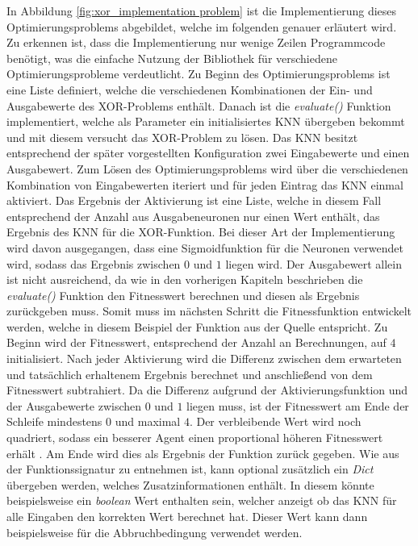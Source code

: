 In Abbildung \ref{fig:xor_implementation problem} ist die Implementierung dieses Optimierungsproblems abgebildet, welche im folgenden genauer erläutert wird. Zu erkennen ist, dass die Implementierung nur wenige Zeilen Programmcode benötigt, was die einfache Nutzung der Bibliothek für verschiedene Optimierungsprobleme verdeutlicht. Zu Beginn des Optimierungsproblems ist eine Liste definiert, welche die verschiedenen Kombinationen der Ein- und Ausgabewerte des XOR-Problems enthält. Danach ist die \emph{evaluate()} Funktion implementiert, welche als Parameter ein initialisiertes \ac{KNN} übergeben bekommt und mit diesem versucht das XOR-Problem zu lösen. Das \ac{KNN} besitzt entsprechend der später vorgestellten Konfiguration zwei Eingabewerte und einen Ausgabewert. Zum Lösen des Optimierungsproblems wird über die verschiedenen Kombination von Eingabewerten iteriert und für jeden Eintrag das \ac{KNN} einmal aktiviert. Das Ergebnis der Aktivierung ist eine Liste, welche in diesem Fall entsprechend der Anzahl aus Ausgabeneuronen nur einen Wert enthält, das Ergebnis des \ac{KNN} für die XOR-Funktion. Bei dieser Art der Implementierung wird davon ausgegangen, dass eine Sigmoidfunktion für die Neuronen verwendet wird, sodass das Ergebnis zwischen $0$ und $1$ liegen wird. Der Ausgabewert allein ist nicht ausreichend, da wie in den vorherigen Kapiteln beschrieben die \emph{evaluate()} Funktion den Fitnesswert berechnen und diesen als Ergebnis zurückgeben muss. Somit muss im nächsten Schritt die Fitnessfunktion entwickelt werden, welche in diesem Beispiel der Funktion aus der Quelle \cite{stanley2002evolving} entspricht. Zu Beginn wird der Fitnesswert, entsprechend der Anzahl an Berechnungen, auf $4$ initialisiert. Nach jeder Aktivierung wird die Differenz zwischen dem erwarteten und tatsächlich erhaltenem Ergebnis berechnet und anschließend von dem Fitnesswert subtrahiert. Da die Differenz aufgrund der Aktivierungsfunktion und der Ausgabewerte zwischen $0$ und $1$ liegen muss, ist der Fitnesswert am Ende der Schleife mindestens $0$ und maximal $4$. Der verbleibende Wert wird noch quadriert, sodass ein besserer Agent einen proportional höheren Fitnesswert erhält \cite{stanley2002evolving}. Am Ende wird dies als Ergebnis der Funktion zurück gegeben. Wie aus der Funktionssignatur zu entnehmen ist, kann optional zusätzlich ein \emph{Dict} übergeben werden, welches Zusatzinformationen enthält. In diesem könnte beispielsweise ein \emph{boolean} Wert enthalten sein, welcher anzeigt ob das \ac{KNN} für alle Eingaben den korrekten Wert berechnet hat. Dieser Wert kann dann beispielsweise für die Abbruchbedingung verwendet werden.


